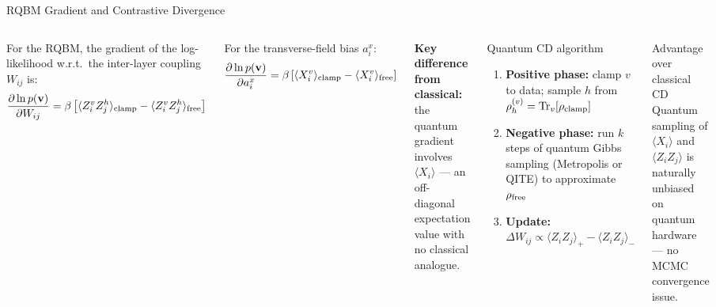 \documentclass[aspectratio=169,10pt]{beamer}
\begin{document}
\begin{frame}{RQBM Gradient and Contrastive Divergence}
  \begin{columns}[T]
      For the RQBM, the gradient of the log-likelihood
      w.r.t.\ the inter-layer coupling $W_{ij}$ is:
      \[
        \frac{\partial\ln p(\mathbf{v})}{\partial W_{ij}}
        = \beta\left[
            \langle Z_i^v Z_j^h\rangle_{\rm clamp}
            - \langle Z_i^v Z_j^h\rangle_{\rm free}
          \right]
      \]

      For the transverse-field bias $a_i^x$:
      \[
        \frac{\partial\ln p(\mathbf{v})}{\partial a_i^x}
        = \beta\left[
            \langle X_i^v\rangle_{\rm clamp}
            - \langle X_i^v\rangle_{\rm free}
          \right]
      \]

      \textbf{Key difference from classical:} the quantum gradient
      involves $\langle X_i\rangle$ — an off-diagonal expectation
      value with no classical analogue.
      \begin{block}{Quantum CD algorithm}
        \begin{enumerate}
          \item \textbf{Positive phase:}
                clamp $v$ to data; sample $h$ from
                $\rho_h^{(v)} = \Tr_v[\rho_{\rm clamp}]$
          \item \textbf{Negative phase:}
                run $k$ steps of quantum Gibbs
                sampling (Metropolis or QITE) to
                approximate $\rho_{\rm free}$
          \item \textbf{Update:}
                $\Delta W_{ij} \propto
                  \langle Z_iZ_j\rangle_+ -
                  \langle Z_iZ_j\rangle_-$
        \end{enumerate}
      \end{block}
      \begin{alertblock}{Advantage over classical CD}
        Quantum sampling of $\langle X_i\rangle$ and
        $\langle Z_iZ_j\rangle$ is naturally unbiased
        on quantum hardware — no MCMC convergence issue.
      \end{alertblock}
  \end{columns}
\end{frame}
\end{document}
